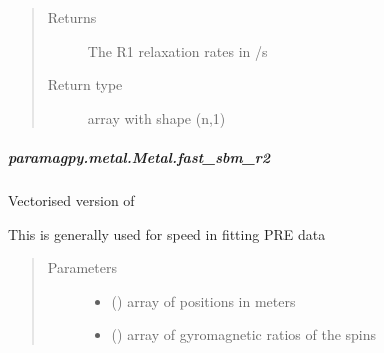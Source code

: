 \documentclass[a4paper,10pt,english,openany,oneside]{sphinxmanual}
\begin{document}
\begin{fulllineitems}
\begin{fulllineitems}
\begin{fulllineitems}
\begin{quote}
\begin{description}
\begin{itemize}
\end{itemize}

\item[{Returns}] \leavevmode
\sphinxAtStartPar
{} \textendash{} The R1 relaxation rates in /s

\item[{Return type}] \leavevmode
\sphinxAtStartPar
array with shape (n,1)

\end{description}\end{quote}

\end{fulllineitems}



\subparagraph{paramagpy.metal.Metal.fast\_sbm\_r2}
\label{\detokenize{reference/generated/paramagpy.metal.Metal.fast_sbm_r2:paramagpy-metal-metal-fast-sbm-r2}}\label{\detokenize{reference/generated/paramagpy.metal.Metal.fast_sbm_r2::doc}}

\begin{fulllineitems}
\label{\detokenize{reference/generated/paramagpy.metal.Metal.fast_sbm_r2:paramagpy.metal.Metal.fast_sbm_r2}}
\sphinxAtStartPar
Vectorised version of {\hyperref[\detokenize{reference/generated/paramagpy.metal.Metal.sbm_r2:paramagpy.metal.Metal.sbm_r2}]{}}

\sphinxAtStartPar
This is generally used for speed in fitting PRE data
\begin{quote}\begin{description}
\item[{Parameters}] \leavevmode\begin{itemize}
\item {} 
\sphinxAtStartPar
{} (\sphinxstyleliteralemphasis{\sphinxupquote{ (}}\sphinxstyleliteralemphasis{\sphinxupquote{,}}\sphinxstyleliteralemphasis{\sphinxupquote{)}}) \textendash{} array of positions in meters

\item {} 
\sphinxAtStartPar
{} (\sphinxstyleliteralemphasis{\sphinxupquote{ (}}\sphinxstyleliteralemphasis{\sphinxupquote{,}}\sphinxstyleliteralemphasis{\sphinxupquote{)}}) \textendash{} array of gyromagnetic ratios of the spins


\end{itemize}
\end{description}
\end{quote}
\end{fulllineitems}
\end{fulllineitems}
\end{fulllineitems}
\end{document}
